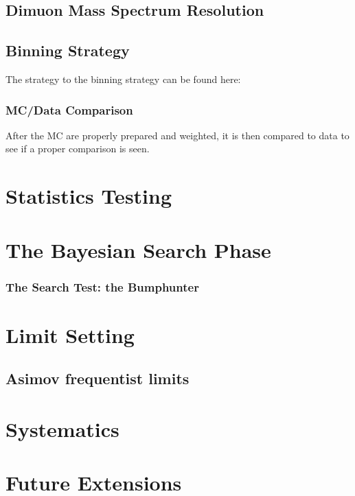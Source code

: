 \subsection{Dimuon Mass Spectrum Resolution}

\subsection{Binning Strategy}
The strategy to the binning strategy can be found here: 

\subsubsection{MC/Data Comparison}
After the MC are properly prepared and weighted, it is then compared to data to see if a proper comparison is seen. 


\section{Statistics Testing}


\section{The Bayesian Search Phase}


    \subsubsection{The Search Test: the Bumphunter}
    
\section{Limit Setting}

\subsection{Asimov frequentist limits}
\section{Systematics}
\section{Future Extensions}

